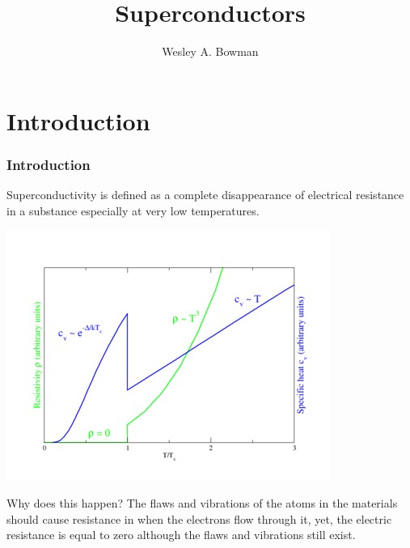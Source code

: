 \documentclass[10pt]{beamer}
\title[Chaos Presentation]{Superconductors}
\author[W. Bowman]{\Large Wesley A. Bowman}
\institute[Acadia University]{\Large Acadia University \\ \normalsize Physics Department}
\theoremstyle{definition}
\begin{document}
\begin{frame}
    \titlepage
\end{frame}


\section{Introduction}
\begin{frame}
    \frametitle{Introduction}

    Superconductivity is defined as a complete disappearance of electrical
    resistance in a substance especially at very low temperatures.

    \begin{center}
    \includegraphics[scale=0.45]{tcSuperVsNormal.png}
    \end{center}

    Why does this happen?
    The flaws and vibrations of the atoms  in the materials should cause resistance in
    when the electrons flow through it,
    yet, the electric resistance is equal to
    zero although the flaws and vibrations still exist.

\end{frame}
\end{document}

